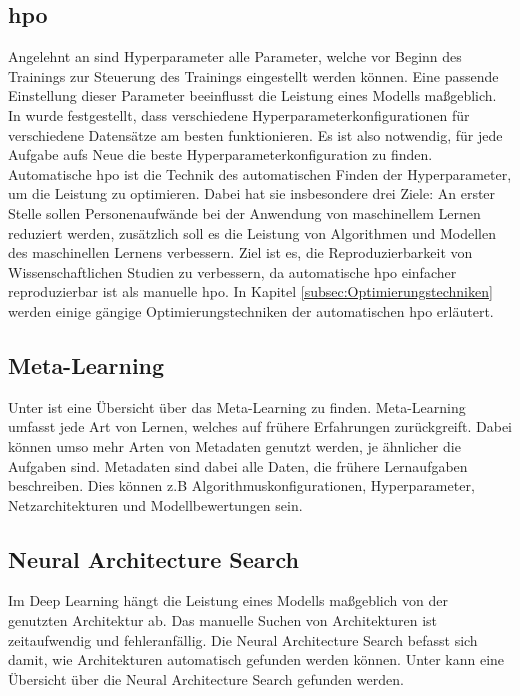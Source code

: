 	\subsection{\acl{hpo}}
	\label{subsec:HyperparameterOptimierung}	
	Angelehnt an \cite{Feurer.2019} sind Hyperparameter alle Parameter, welche vor Beginn des Trainings zur Steuerung des Trainings eingestellt werden können. Eine passende Einstellung dieser Parameter beeinflusst die Leistung eines Modells maßgeblich. In \cite{Kohavi.1995} wurde festgestellt, dass verschiedene Hyperparameterkonfigurationen für verschiedene Datensätze am besten funktionieren. Es ist also notwendig, für jede Aufgabe aufs Neue die beste Hyperparameterkonfiguration zu finden. Automatische \ac{hpo} ist die Technik des automatischen Finden der Hyperparameter, um die Leistung zu optimieren. Dabei hat sie insbesondere drei Ziele: An erster Stelle sollen Personenaufwände bei der Anwendung von maschinellem Lernen reduziert werden, zusätzlich soll es die Leistung von Algorithmen und Modellen des maschinellen Lernens verbessern. Ziel ist es, die Reproduzierbarkeit von Wissenschaftlichen Studien zu verbessern, da automatische \ac{hpo} einfacher reproduzierbar ist als manuelle \ac{hpo}. In Kapitel \ref{subsec:Optimierungstechniken} werden einige gängige Optimierungstechniken der automatischen \ac{hpo} erläutert. 	 
		
	\subsection{Meta-Learning}
	\label{subsec:MetaLearning}
	Unter \cite{JoaquinVanschoren.2018} ist eine Übersicht über das Meta-Learning zu finden. Meta-Learning umfasst jede Art von Lernen, welches auf frühere Erfahrungen zurückgreift. Dabei können umso mehr Arten von Metadaten genutzt werden, je ähnlicher die Aufgaben sind. Metadaten sind dabei alle Daten, die frühere Lernaufgaben beschreiben. Dies können z.B Algorithmuskonfigurationen, Hyperparameter, Netzarchitekturen und Modellbewertungen sein.
	
	\subsection{Neural Architecture Search}
	\label{subsec:NeuralArchitectureSearch}
	Im Deep Learning hängt die Leistung eines Modells maßgeblich von der genutzten Architektur ab. Das manuelle Suchen von Architekturen ist zeitaufwendig und fehleranfällig. Die Neural Architecture Search befasst sich damit, wie Architekturen automatisch gefunden werden können. Unter \cite{Elsken.2019} kann eine Übersicht über die Neural Architecture Search gefunden werden. 	


